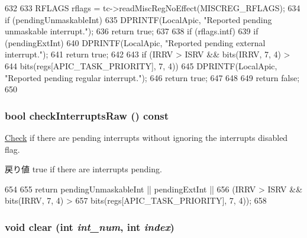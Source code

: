 \begin{DoxyCode}
632 {
633     RFLAGS rflags = tc->readMiscRegNoEffect(MISCREG_RFLAGS);
634     if (pendingUnmaskableInt) {
635         DPRINTF(LocalApic, "Reported pending unmaskable interrupt.\n");
636         return true;
637     }
638     if (rflags.intf) {
639         if (pendingExtInt) {
640             DPRINTF(LocalApic, "Reported pending external interrupt.\n");
641             return true;
642         }
643         if (IRRV > ISRV && bits(IRRV, 7, 4) >
644                bits(regs[APIC_TASK_PRIORITY], 7, 4)) {
645             DPRINTF(LocalApic, "Reported pending regular interrupt.\n");
646             return true;
647         }
648     }
649     return false;
650 }
\end{DoxyCode}
\hypertarget{classX86ISA_1_1Interrupts_a764a42ffe59f12449457ca2373515884}{
\subsubsection[{checkInterruptsRaw}]{\setlength{\rightskip}{0pt plus 5cm}bool checkInterruptsRaw () const}}
\label{classX86ISA_1_1Interrupts_a764a42ffe59f12449457ca2373515884}
\hyperlink{classCheck}{Check} if there are pending interrupts without ignoring the interrupts disabled flag.

\begin{DoxyReturn}{戻り値}
true if there are interrupts pending. 
\end{DoxyReturn}



\begin{DoxyCode}
654 {
655     return pendingUnmaskableInt || pendingExtInt ||
656         (IRRV > ISRV && bits(IRRV, 7, 4) >
657          bits(regs[APIC_TASK_PRIORITY], 7, 4));
658 }
\end{DoxyCode}
\hypertarget{classX86ISA_1_1Interrupts_af60c3484087379d0330467d77f6cbaae}{
\subsubsection[{clear}]{\setlength{\rightskip}{0pt plus 5cm}void clear (int {\em int\_\-num}, \/  int {\em index})}}
\label{classX86ISA_1_1Interrupts_af60c3484087379d0330467d77f6cbaae}



